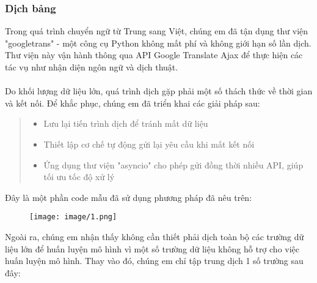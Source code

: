\subsubsection{Dịch bảng}
Trong quá trình chuyển ngữ từ Trung sang Việt, chúng em đã tận dụng thư viện "googletrans" - một công cụ Python không mất phí và không giới hạn số lần dịch. Thư viện này vận hành thông qua API Google Translate Ajax để thực hiện các tác vụ như nhận diện ngôn ngữ và dịch thuật.\\
\\
Do khối lượng dữ liệu lớn, quá trình dịch gặp phải một số thách thức về thời gian và kết nối. Để khắc phục, chúng em đã triển khai các giải pháp sau:
\begin{quote}
\begin{itemize}
    \item Lưu lại tiến trình dịch để tránh mất dữ liệu
    \item Thiết lập cơ chế tự động gửi lại yêu cầu khi mất kết nối
    \item Ứng dụng thư viện "asyncio" cho phép gửi đồng thời nhiều API, giúp tối ưu tốc độ xử lý
\end{itemize}
\end{quote}
Đây là một phần code mẫu đã sử dụng phương pháp đã nêu trên:\\
\begin{figure}[h]
    \centering
    \texttt{[image: image/1.png]}
\end{figure}
\newpage
Ngoài ra, chúng em nhận thấy không cần thiết phải dịch toàn bộ các trường dữ liệu lớn để huấn luyện mô hình vì một số trường dữ liệu không hỗ trợ cho việc huấn luyện mô hình. Thay vào đó, chúng em chỉ tập trung dịch 1 số trường sau đây:
